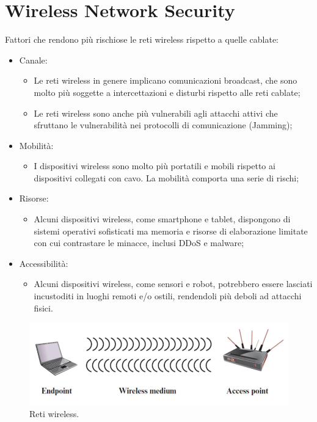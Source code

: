 \setchapterpreamble[u]{\margintoc}
\chapter{Wireless Network Security}

Fattori che rendono più rischiose le reti wireless rispetto a quelle cablate:
\begin{itemize}
    \item Canale: 
	\begin{itemize}
	    \item Le reti wireless in genere implicano comunicazioni broadcast, che sono molto più soggette a intercettazioni e disturbi rispetto alle reti cablate;
		\item Le reti wireless sono anche più vulnerabili agli attacchi attivi che sfruttano le vulnerabilità nei protocolli di comunicazione (Jamming);
	\end{itemize}
	\item Mobilità:
	\begin{itemize}
	    \item I dispositivi wireless sono molto più portatili e mobili rispetto ai dispositivi collegati con cavo. La mobilità comporta una serie di rischi;
	\end{itemize}
	\item Risorse:
	\begin{itemize}
	    \item Alcuni dispositivi wireless, come smartphone e tablet, dispongono di sistemi operativi sofisticati ma memoria e risorse di elaborazione limitate con cui contrastare le minacce, inclusi DDoS e malware;
	\end{itemize}
	\item Accessibilità:
	\begin{itemize}
	    \item Alcuni dispositivi wireless, come sensori e robot, potrebbero essere lasciati incustoditi in luoghi remoti e/o ostili, rendendoli più deboli ad attacchi fisici.
	\end{itemize}
\end{itemize}

\begin{figure}[h]
    \centering
    \includegraphics[width=1\textwidth]{images/chapter6/6-1.png}
    \caption{Reti wireless.}
    \label{fig:6-1}
\end{figure}

